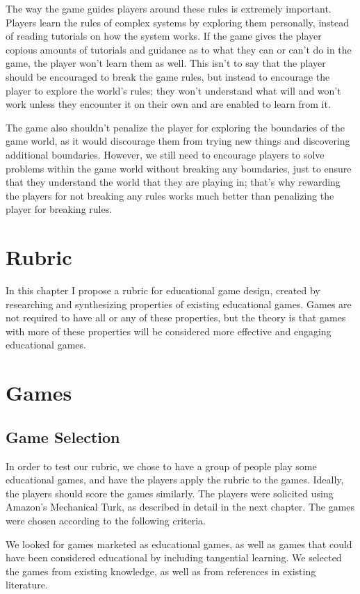 \documentclass[12pt]{report}
\begin{document}
		The way the game guides players around these rules is extremely important. Players learn the rules of complex systems by exploring them personally, instead of reading tutorials on how the system works.  If the game gives the player copious amounts of tutorials and guidance as to what they can or can't do in the game, the player won't learn them as well. This isn't to say that the player should be encouraged to break the game rules, but instead to encourage the player to explore the world's rules; they won't understand what will and won't work unless they encounter it on their own and are enabled to learn from it.
	
		The game also shouldn't penalize the player for exploring the boundaries of the game world, as it would discourage them from trying new things and discovering additional boundaries. However, we still need to encourage players to solve problems within the game world without breaking any boundaries, just to ensure that they understand the world that they are playing in; that's why rewarding the players for not breaking any rules works much better than penalizing the player for breaking rules.

\chapter{Rubric}
	In this chapter I propose a rubric for educational game design, created by researching and synthesizing properties of existing educational games. Games are not required to have all or any of these properties, but the theory is that games with more of these properties will be considered more effective and engaging educational games.



\chapter{Games}
	\section{Game Selection}
		In order to test our rubric, we chose to have a group of people play some educational games, and have the players apply the rubric to the games.  Ideally, the players should score the games similarly.  The players were solicited using Amazon's Mechanical Turk, as described in detail in the next chapter.  The games were chosen according to the following criteria.

		 We looked for games marketed as educational games, as well as games that could have been considered educational by including tangential learning. We selected the games from existing knowledge, as well as from references in existing literature.
\end{document}
